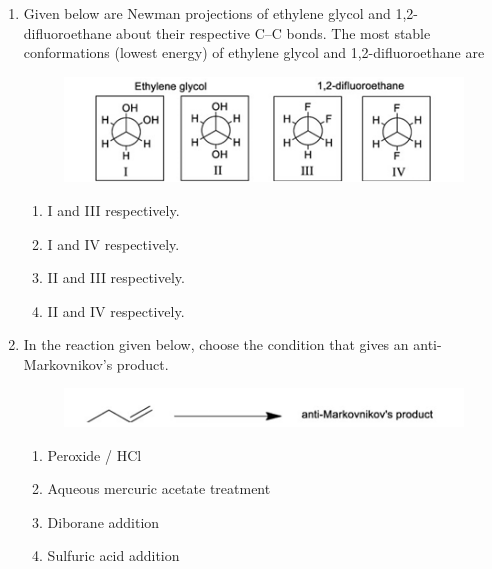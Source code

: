 \documentclass[journal,12pt,onecolumn]{IEEEtran}
\begin{document}
\begin{enumerate}[label=\arabic*., start=6]
\item Given below are Newman projections of ethylene glycol and 1,2-difluoroethane about their respective C--C bonds. The most stable conformations (lowest energy) of ethylene glycol and 1,2-difluoroethane are

\begin{figure}[H]
\centering
\includegraphics[width=0.7\columnwidth]{FIG/P-9.png}
\caption*{}
\label{GA-10}
\end{figure}

\begin{multicols}{1}
\begin{enumerate}[label=(\Alph*)]
\item I and III respectively.
\item I and IV respectively.
\item II and III respectively.
\item II and IV respectively.
\end{enumerate}
\end{multicols}

\item In the reaction given below, choose the condition that gives an anti-Markovnikov’s product.

\begin{figure}[H]
\centering
\includegraphics[width=0.7\columnwidth]{FIG/P-10.png}
\caption*{}
\label{P-10}
\end{figure}

\begin{multicols}{1}
\begin{enumerate}[label=(\Alph*)]
\item Peroxide / HCl
\item Aqueous mercuric acetate treatment
\item Diborane addition
\item Sulfuric acid addition
\end{enumerate}
\end{multicols}


\end{enumerate}
\end{document}
